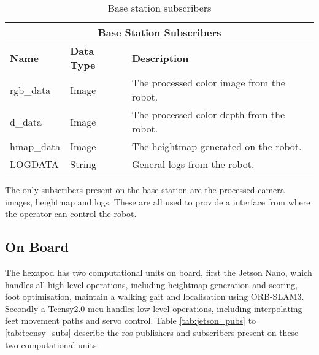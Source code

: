         \begin{table}[h]
            \centering
            \begin{tabularx}{\textwidth}{| l | l | X |}
                \hline
                \multicolumn{3}{|c|}{\textbf{Base Station Subscribers}} \\ \hline
                \textbf{Name} & \textbf{Data Type} & \textbf{Description} \\ \hline
                rgb\_data & Image & The processed color image from the robot. \\ \hline
                d\_data & Image & The processed color depth from the robot. \\ \hline
                hmap\_data & Image & The heightmap generated on the robot. \\ \hline
                LOGDATA & String & General logs from the robot. \\ \hline
            \end{tabularx}
            \caption{Base station subscribers}
            \label{tab:base_subs}
        \end{table}
        
        \noindent
        The only subscribers present on the base station are the processed camera images, heightmap and logs. These are all used to provide a interface from where
        the operator can control the robot.

    \subsection{On Board} \label{sec:on_board_ros}
        The hexapod has two computational units on board, first the Jetson Nano, which handles all high level operations, including heightmap generation and scoring,
        foot optimisation, maintain a walking gait and localisation using ORB-SLAM3. Secondly a Teensy2.0 \ac{mcu} handles low level operations, including interpolating feet movement paths
        and servo control. 
        Table \ref{tab:jetson_pubs} to \ref{tab:teensy_subs} describe the \ac{ros} publishers and subscribers present on these two computational units.
        
